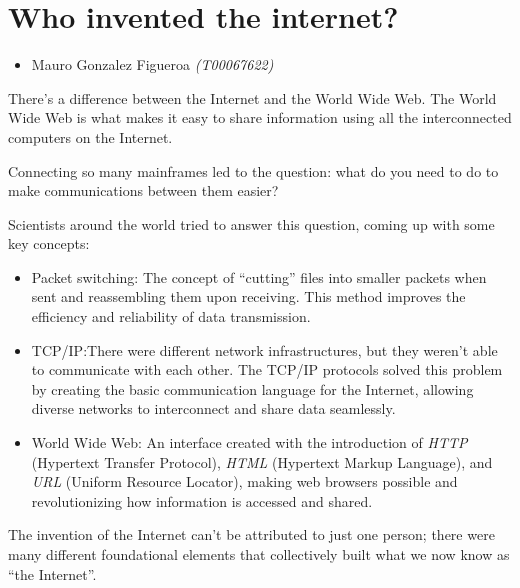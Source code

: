 \documentclass[letterpaper, 12pt]{article}
\begin{document}
\section*{Who invented the internet?}

\begin{itemize}[label=$\triangleright$]
      \item Mauro Gonzalez Figueroa \textit{(T00067622)}
\end{itemize}

\nocite{*}

There's a difference between the Internet and the World Wide Web. The World
Wide Web is what makes it easy to share information using all the
interconnected computers on the Internet.

Connecting so many mainframes led to the question: what do you need to do to
make communications between them easier?

Scientists around the world tried to answer this question, coming up with some
key concepts:

\begin{itemize}
      \item Packet switching: The concept of ``cutting'' files into smaller packets when sent
            and reassembling them upon receiving. This method improves the efficiency and
            reliability of data transmission.
      \item TCP/IP:\@{}There were different network infrastructures, but they weren't able
            to communicate with each other. The TCP/IP protocols solved this problem by
            creating the basic communication language for the Internet, allowing diverse
            networks to interconnect and share data seamlessly.
      \item World Wide Web: An interface created with the introduction of \textit{HTTP}
            (Hypertext Transfer Protocol), \textit{HTML} (Hypertext Markup Language), and
            \textit{URL} (Uniform Resource Locator), making web browsers possible and
            revolutionizing how information is accessed and shared.
\end{itemize}

The invention of the Internet can't be attributed to just one person; there
were many different foundational elements that collectively built what we now
know as ``the Internet''.

\printbibliography
\end{document}
